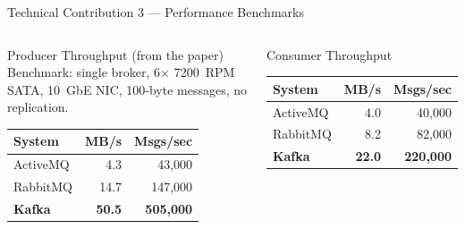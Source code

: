 \documentclass[aspectratio=169,10pt]{beamer}
\begin{document}
\begin{frame}{Technical Contribution 3 — Performance Benchmarks}
  \begin{columns}[T]
      \begin{block}{Producer Throughput (from the paper)}
        Benchmark: single broker, 6$\times$ 7200~RPM SATA,
        10~GbE NIC, 100-byte messages, no replication.
        \begin{center}
        \renewcommand{\arraystretch}{1.3}
        \begin{tabular}{@{}lrr@{}}
          \toprule
          \textbf{System} & \textbf{MB/s} & \textbf{Msgs/sec} \\
          \midrule
          ActiveMQ        &  4.3 &   43{,}000 \\
          RabbitMQ        & 14.7 &  147{,}000 \\
          \textbf{Kafka}  & \textbf{50.5} & \textbf{505{,}000} \\
          \bottomrule
        \end{tabular}
        \end{center}
      \end{block}
      \vspace{5pt}
      \begin{block}{Consumer Throughput}
        \begin{center}
        \renewcommand{\arraystretch}{1.3}
        \begin{tabular}{@{}lrr@{}}
          \toprule
          \textbf{System} & \textbf{MB/s} & \textbf{Msgs/sec} \\
          \midrule
          ActiveMQ       &  4.0 &   40{,}000 \\
          RabbitMQ       &  8.2 &   82{,}000 \\
          \textbf{Kafka} & \textbf{22.0} & \textbf{220{,}000} \\
          \bottomrule
        \end{tabular}
        \end{center}
      \end{block}


\end{columns}
\end{frame}
\end{document}
